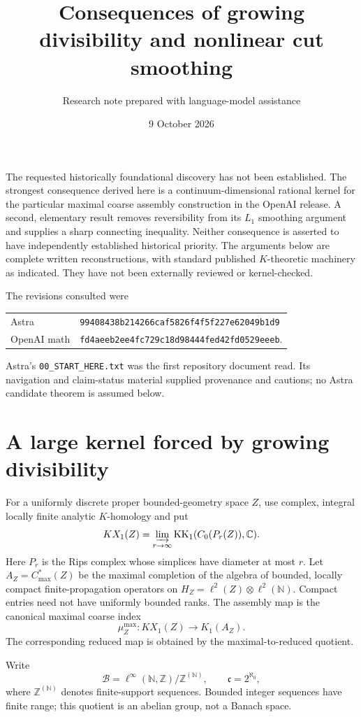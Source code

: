 \documentclass[11pt]{article}
\title{Consequences of growing divisibility and nonlinear cut smoothing}
\author{Research note prepared with language-model assistance}
\date{9 October 2026}
\theoremstyle{remark}\newtheorem{remark}[theorem]{Remark}
\newcommand{\Z}{\mathbb Z}\newcommand{\Q}{\mathbb Q}\newcommand{\R}{\mathbb R}
\newcommand{\N}{\mathbb N}\newcommand{\C}{\mathbb C}
\newcommand{\KX}{KX}\newcommand{\KK}{\operatorname{KK}}
\newcommand{\co}{\mathfrak c}\newcommand{\id}{\operatorname{id}}
\begin{document}
\maketitle

The requested historically foundational discovery has not been established.
The strongest consequence derived here is a continuum-dimensional rational
kernel for the particular maximal coarse assembly construction in the
OpenAI release. A second, elementary result removes reversibility from its
$L_1$ smoothing argument and supplies a sharp connecting inequality.
Neither consequence is asserted to have independently established historical
priority. The arguments below are complete written reconstructions, with
standard published $K$-theoretic machinery as indicated. They have not been
externally reviewed or kernel-checked.

The revisions consulted were
\begin{center}\small
\begin{tabular}{ll}
Astra & \texttt{99408438b214266caf5826f4f5f227e62049b1d9}\\
OpenAI math & \texttt{fd4aeeb2ee4fc729c18d98444fed42fd0529eeeb}.
\end{tabular}
\end{center}
Astra's \texttt{00\_START\_HERE.txt} was the first repository document read.
Its navigation and claim-status material supplied provenance and cautions;
no Astra candidate theorem is assumed below.

\section{A large kernel forced by growing divisibility}

For a uniformly discrete proper bounded-geometry space $Z$, use complex,
integral locally finite analytic $K$-homology and put
\[
 \KX_1(Z)=\varinjlim_{r\to\infty}\KK_1(C_0(P_r(Z)),\C).
\]
Here $P_r$ is the Rips complex whose simplices have diameter at most $r$.
Let $A_Z=C^*_{\max}(Z)$ be the maximal completion of the algebra of bounded,
locally compact finite-propagation operators on
$H_Z=\ell^2(Z)\otimes\ell^2(\N)$. Compact entries need not have uniformly
bounded ranks. The assembly map is the canonical maximal coarse index
\[
 \mu_Z^{\max}:\KX_1(Z)\longrightarrow K_1(A_Z).
\]
The corresponding reduced map is obtained by the maximal-to-reduced quotient.

Write
\[
 \mathcal B=\ell^\infty(\N,\Z)/\Z^{(\N)},\qquad \co=2^{\aleph_0},
\]
where $\Z^{(\N)}$ denotes finite-support sequences. Bounded integer sequences
have finite range; this quotient is an abelian group, not a Banach space.
\end{document}
